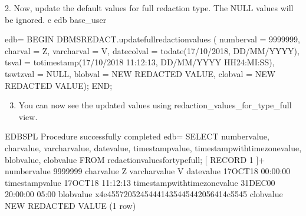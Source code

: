 \documentclass[letterpaper,10pt,english,openany,oneside]{sphinxmanual}
\begin{document}
2. Now, update the default values for full redaction type. The NULL values will be ignored.
c edb base\_user

%
\begin{sphinxVerbatim}[commandchars=\\\{\}]
edb=\PYGZsh{} BEGIN
    DBMS\PYGZus{}REDACT.update\PYGZus{}full\PYGZus{}redaction\PYGZus{}values (
    number\PYGZus{}val =\PYGZgt{} 9999999,
    char\PYGZus{}val =\PYGZgt{} \PYGZsq{}Z\PYGZsq{},
    varchar\PYGZus{}val =\PYGZgt{} \PYGZsq{}V\PYGZsq{},
    datecol\PYGZus{}val =\PYGZgt{} to\PYGZus{}date(\PYGZsq{}17/10/2018\PYGZsq{}, \PYGZsq{}DD/MM/YYYY\PYGZsq{}),
    ts\PYGZus{}val =\PYGZgt{} to\PYGZus{}timestamp(\PYGZsq{}17/10/2018 11:12:13\PYGZsq{}, \PYGZsq{}DD/MM/YYYY HH24:MI:SS\PYGZsq{}),
    tswtz\PYGZus{}val =\PYGZgt{} NULL,
    blob\PYGZus{}val =\PYGZgt{} \PYGZsq{}NEW REDACTED VALUE\PYGZsq{},
    clob\PYGZus{}val =\PYGZgt{} \PYGZsq{}NEW REDACTED VALUE\PYGZsq{});
END;
\end{sphinxVerbatim}
\begin{enumerate}
\setcounter{enumi}{2}
\item {} 
You can now see the updated values using redaction\_values\_for\_type\_full view.

\end{enumerate}

%
\begin{sphinxVerbatim}[commandchars=\\\{\}]
EDB\PYGZhy{}SPL Procedure successfully completed
edb=\PYGZsh{} SELECT number\PYGZus{}value, char\PYGZus{}value, varchar\PYGZus{}value, date\PYGZus{}value,
       timestamp\PYGZus{}value, timestamp\PYGZus{}with\PYGZus{}time\PYGZus{}zone\PYGZus{}value, blob\PYGZus{}value, clob\PYGZus{}value
FROM redaction\PYGZus{}values\PYGZus{}for\PYGZus{}type\PYGZus{}full;
\PYGZhy{}[ RECORD 1 ]\PYGZhy{}\PYGZhy{}\PYGZhy{}\PYGZhy{}\PYGZhy{}\PYGZhy{}\PYGZhy{}\PYGZhy{}\PYGZhy{}\PYGZhy{}\PYGZhy{}\PYGZhy{}\PYGZhy{}\PYGZhy{}\PYGZhy{}\PYGZhy{}\PYGZhy{}\PYGZhy{}+\PYGZhy{}\PYGZhy{}\PYGZhy{}\PYGZhy{}\PYGZhy{}\PYGZhy{}\PYGZhy{}\PYGZhy{}\PYGZhy{}\PYGZhy{}\PYGZhy{}\PYGZhy{}\PYGZhy{}\PYGZhy{}\PYGZhy{}\PYGZhy{}\PYGZhy{}\PYGZhy{}\PYGZhy{}\PYGZhy{}\PYGZhy{}\PYGZhy{}\PYGZhy{}\PYGZhy{}\PYGZhy{}\PYGZhy{}\PYGZhy{}\PYGZhy{}\PYGZhy{}\PYGZhy{}\PYGZhy{}\PYGZhy{}\PYGZhy{}\PYGZhy{}\PYGZhy{}\PYGZhy{}\PYGZhy{}\PYGZhy{}\PYGZhy{}
number\PYGZus{}value                   \textbar{} 9999999
char\PYGZus{}value                     \textbar{} Z
varchar\PYGZus{}value                  \textbar{} V
date\PYGZus{}value                     \textbar{} 17\PYGZhy{}OCT\PYGZhy{}18 00:00:00
timestamp\PYGZus{}value                \textbar{} 17\PYGZhy{}OCT\PYGZhy{}18 11:12:13
timestamp\PYGZus{}with\PYGZus{}time\PYGZus{}zone\PYGZus{}value \textbar{} 31\PYGZhy{}DEC\PYGZhy{}00 20:00:00 \PYGZhy{}05:00
blob\PYGZus{}value                     \textbar{} \PYGZbs{}x4e45572052454441435445442056414c5545
clob\PYGZus{}value                     \textbar{} NEW REDACTED VALUE
(1 row)
\end{sphinxVerbatim}
\end{document}
